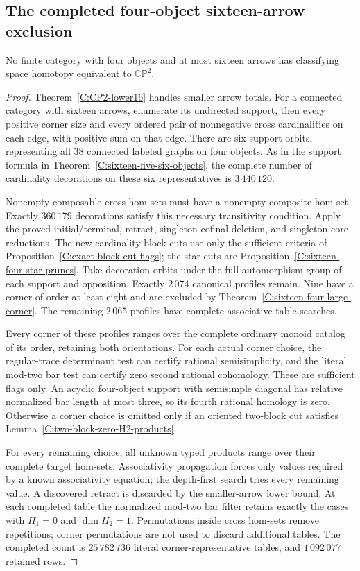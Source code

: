 \subsection{The completed four-object sixteen-arrow exclusion}

\begin{theorem}\label{C:sixteen-four-objects}
No finite category with four objects and at most sixteen arrows
has classifying space homotopy equivalent to $\mathbb {CP}^2$.
\end{theorem}
\begin{proof}
Theorem~\ref{C:CP2-lower16} handles smaller arrow totals.
For a connected category with sixteen arrows, enumerate its
undirected support, then every positive corner size and every
ordered pair of nonnegative cross cardinalities on each edge,
with positive sum on that edge.  There are six support orbits,
representing all $38$ connected labeled graphs on four objects.
As in the support formula in
Theorem~\ref{C:sixteen-five-six-objects}, the complete number
of cardinality decorations on these six representatives is
$3\,440\,120$.

Nonempty composable cross hom-sets must have a nonempty composite
hom-set.  Exactly $360\,179$ decorations satisfy this necessary
transitivity condition.  Apply the proved initial/terminal,
retract, singleton cofinal-deletion, and singleton-core reductions.
The new cardinality block cuts use only the sufficient criteria of
Proposition~\ref{C:exact-block-cut-flags}; the star cuts are
Proposition~\ref{C:sixteen-four-star-prunes}.
Take decoration orbits under the full automorphism group of each
support and opposition.  Exactly $2\,074$ canonical profiles remain.
Nine have a corner of order at least eight and are excluded by
Theorem~\ref{C:sixteen-four-large-corner}.
The remaining $2\,065$ profiles have complete associative-table
searches.

Every corner of these profiles ranges over the complete ordinary
monoid catalog of its order, retaining both orientations.
For each actual corner choice, the regular-trace determinant test
can certify rational semisimplicity, and the literal mod-two bar
test can certify zero second rational cohomology.  These are
sufficient flags only.  An acyclic four-object support with
semisimple diagonal has relative normalized bar length at most
three, so its fourth rational homology is zero.  Otherwise a
corner choice is omitted only if an oriented two-block cut
satisfies Lemma~\ref{C:two-block-zero-H2-products}.

For every remaining choice, all unknown typed products range
over their complete target hom-sets.  Associativity propagation
forces only values required by a known associativity equation;
the depth-first search tries every remaining value.  A discovered
retract is discarded by the smaller-arrow lower bound.
At each completed table the normalized mod-two bar filter retains
exactly the cases with $H_1=0$ and $\dim H_2=1$.
Permutations inside cross hom-sets remove repetitions; corner
permutations are not used to discard additional tables.
The completed count is $25\,782\,736$ literal
corner-representative tables, and $1\,092\,077$ retained rows.


\end{proof}

